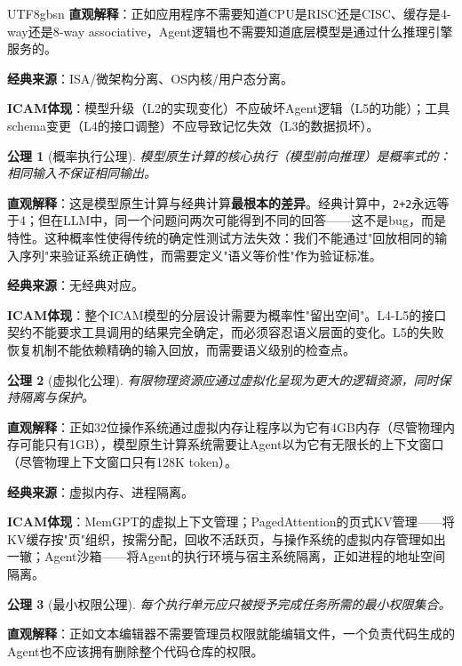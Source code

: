 \documentclass[11pt,a4paper]{article}
\newtheorem{axiom}{公理}[section]
\begin{document}
\begin{CJK*}{UTF8}{gbsn}
\textbf{直观解释}：正如应用程序不需要知道CPU是RISC还是CISC、缓存是4-way还是8-way associative，Agent逻辑也不需要知道底层模型是通过什么推理引擎服务的。

\textbf{经典来源}：ISA/微架构分离、OS内核/用户态分离\cite{hennessy2017quantitative,ostep_2023}。

\textbf{ICAM体现}：模型升级（L2的实现变化）不应破坏Agent逻辑（L5的功能）；工具schema变更（L4的接口调整）不应导致记忆失效（L3的数据损坏）。

\begin{axiom}[概率执行公理]
模型原生计算的核心执行（模型前向推理）是概率式的：相同输入不保证相同输出。
\end{axiom}

\textbf{直观解释}：这是模型原生计算与经典计算\textbf{最根本的差异}。经典计算中，\texttt{2+2}永远等于4；但在LLM中，同一个问题问两次可能得到不同的回答——这不是bug，而是特性。这种概率性使得传统的确定性测试方法失效：我们不能通过"回放相同的输入序列"来验证系统正确性，而需要定义"语义等价性"作为验证标准。

\textbf{经典来源}：无经典对应。

\textbf{ICAM体现}：整个ICAM模型的分层设计需要为概率性"留出空间"。L4-L5的接口契约不能要求工具调用的结果完全确定，而必须容忍语义层面的变化。L5的失败恢复机制不能依赖精确的输入回放，而需要语义级别的检查点。

\begin{axiom}[虚拟化公理]
有限物理资源应通过虚拟化呈现为更大的逻辑资源，同时保持隔离与保护。
\end{axiom}

\textbf{直观解释}：正如32位操作系统通过虚拟内存让程序以为它有4GB内存（尽管物理内存可能只有1GB），模型原生计算系统需要让Agent以为它有无限长的上下文窗口（尽管物理上下文窗口只有128K token）。

\textbf{经典来源}：虚拟内存、进程隔离\cite{ostep_2023}。

\textbf{ICAM体现}：MemGPT的虚拟上下文管理\cite{memgpt2023}；PagedAttention的页式KV管理\cite{kwon2023pagedattention}——将KV缓存按"页"组织，按需分配，回收不活跃页，与操作系统的虚拟内存管理如出一辙；Agent沙箱\cite{openai_codex_sandbox_2026}——将Agent的执行环境与宿主系统隔离，正如进程的地址空间隔离。

\begin{axiom}[最小权限公理]
每个执行单元应只被授予完成任务所需的最小权限集合。
\end{axiom}

\textbf{直观解释}：正如文本编辑器不需要管理员权限就能编辑文件，一个负责代码生成的Agent也不应该拥有删除整个代码仓库的权限。


\end{CJK*}
\end{document}
